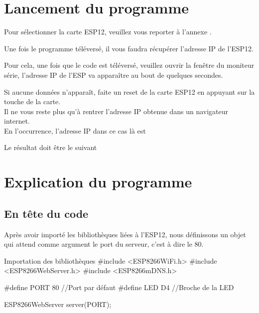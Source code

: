 \section{Lancement du programme}

Pour sélectionner la carte ESP12, veuillez vous reporter à l'annexe .


Une fois le programme téléversé, il vous faudra récupérer l'adresse IP de l'ESP12.


Pour cela, une fois que le code est téléversé, veuillez ouvrir la fenêtre du moniteur série, l’adresse IP de l'ESP va apparaître 
au bout de quelques secondes.\\


Si aucune données n’apparaît, faite un reset de la carte ESP12 en appuyant sur la touche  de la carte.\\

Il ne vous reste plus qu'à rentrer l’adresse IP obtenue dans un navigateur internet.\\
En l’occurrence, l'adresse IP dans ce cas là est 


Le résultat doit être le suivant \\


\section{Explication du programme}


\subsection{En tête du code}

Après avoir importé les bibliothèques liées à l'ESP12, nous définissons un objet  qui attend 
comme argument le port du serveur, c'est à dire le 80.
\begin{Cpp}{Importation des bibliothèques}
#include <ESP8266WiFi.h>
#include <ESP8266WebServer.h>
#include <ESP8266mDNS.h>
        
#define PORT 80 //Port par défaut
#define LED D4  //Broche de la LED
        
ESP8266WebServer server(PORT);
\end{Cpp}


